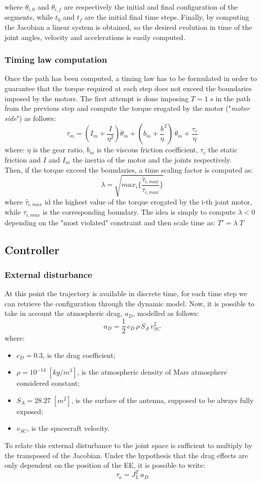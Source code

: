 where $\theta_{i,0}$ and $\theta_{i,f}$ are respectively the initial and final configuration of the segments, while $t_0$ and $t_f$ are the initial final time steps.
Finally, by computing the Jacobian a linear system is obtained, so the desired evolution in time of the joint angles, velocity and accelerations is easily computed.\\

\subsubsection{Timing law computation}
Once the path has been computed, a timing law has to be formulated in order to guarantee that the torque required at each step does not exceed the boundaries imposed by the motors. The first attempt is done imposing $T=1\; s$ in the path from the previous step and compute the torque erogated by the motor ("\textit{motor side}") as follows:
$$\tau_m=\left (I_m+\dfrac{I}{\eta^2}\right)\ddot{\theta}_m + \left(b_m+\dfrac{b}{\eta}^2\right)\,\dot{\theta}_m + \dfrac{\tau_c}{\eta}$$
where: $\eta$ is the gear ratio, $b_m$ is the viscous friction coefficient, $\tau_c$ the static friction and $I$ and $I_m$ the inertia of the motor and the joints respectively. \\
Then, if the torque exceed the boundaries, a time scaling factor is computed as:
$$\lambda = \sqrt{max_i\bigg\{\frac{\hat{\tau}_{i,max}}{\tau_{i,max}}\bigg\}}$$
where $\hat{\tau}_{i,max}$ id the highest value of the torque erogated by the i-th joint motor, while $\tau_{i,max}$ is the corresponding boundary. The idea is simply to compute $\lambda < 0$ depending on the "most violated" constraint and then scale time as: $T'=\lambda\;T$



\subsection{Controller}
\subsubsection{External disturbance}
At this point the trajectory is available in discrete time, for each time step we can retrieve the configuration through the dynamic model. Now, it is possible to take in account the atmospheric drag, $a_D$, modelled as follows:
$$a_D=\frac{1}{2}\,c_D\,\rho\,S_A\,v_{SC}^2$$
where:
\begin{itemize}
    \item $c_D = 0.3$, is the drag coefficient;
    \item $\rho = 10^{-14}\; [kg/m^3]$, is the atmospheric density of Mars atmosphere considered constant;
    \item $S_A = 28.27\; [m^2]$, is the surface of the antenna, supposed to be always fully exposed;
    \item $v_{SC}$, is the spacecraft velocity.
\end{itemize}
To relate this external disturbance to the joint space is sufficient to multiply by the transposed of the Jacobian. Under the hypothesis that the drag effects are only dependent on the position of the EE, it is possible to write:
$$\tau_a=J_L^T\,a_D$$

